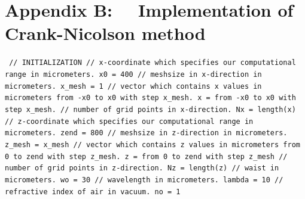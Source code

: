\documentclass[a4paper]{article}
\begin{document}
	\section*{Appendix B: ~~Implementation of Crank-Nicolson method}
		\texttt{\noindent
			\textcolor{OliveGreen}{// INITIALIZATION\newline\newline
		// x-coordinate which specifies our computational range in micrometers.}\newline
		x0 = 400 \newline
		\textcolor{OliveGreen}{// meshsize in x-direction in micrometers.}\newline
		x\_mesh = 1 \newline
		\textcolor{OliveGreen}{// vector which contains x values in micrometers from -x0 to x0 with step x\_mesh.}\newline
		x = from -x0 to x0 with step x\_mesh.\newline
		\textcolor{OliveGreen}{// number of grid points in x-direction.}\newline
		Nx = length(x)\newline\newline
		\textcolor{OliveGreen}{// z-coordinate which specifies our computational range in micrometers.}\newline
		zend = 800 \newline
		\textcolor{OliveGreen}{// meshsize in z-direction in micrometers.}\newline
		z\_mesh = x\_mesh \newline
		\textcolor{OliveGreen}{// vector which contains z values in micrometers from 0 to zend with step z\_mesh.}\newline
		z = from 0 to zend with step z\_mesh\newline
		\textcolor{OliveGreen}{// number of grid points in z-direction.}\newline
		Nz = length(z)\newline
		\textcolor{OliveGreen}{// waist in micrometers.}\newline
		wo = 30 \newline
		\textcolor{OliveGreen}{// wavelength in micrometers.}\newline
		lambda = 10\newline
		\textcolor{OliveGreen}{// refractive index of air in vacuum.}\newline
		no = 1\newline
}
\end{document}
